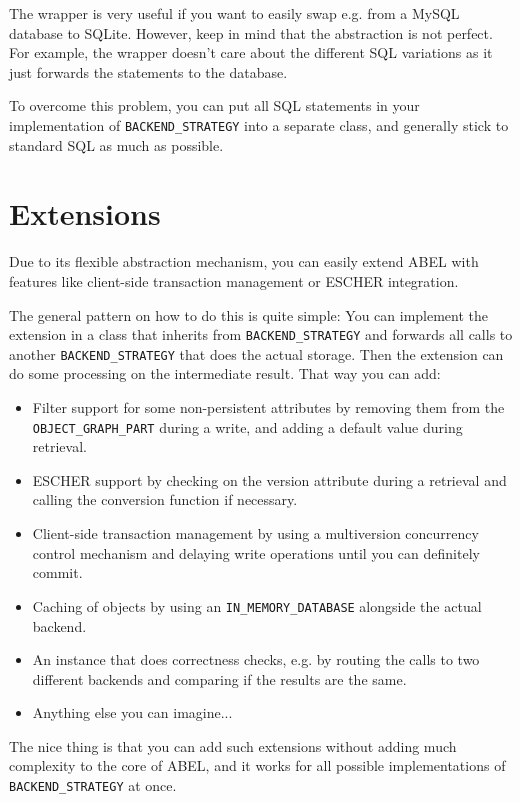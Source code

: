 The wrapper is very useful if you want to easily swap e.g. from a MySQL database to SQLite.
However, keep in mind that the abstraction is not perfect. 
For example, the wrapper doesn't care about the different SQL variations as it just forwards the statements to the database.

To overcome this problem, you can put all SQL statements in your implementation of \lstinline!BACKEND_STRATEGY! into a separate class, and generally stick to standard SQL as much as possible.


\section{Extensions}

Due to its flexible abstraction mechanism, you can easily extend ABEL with features like client-side transaction management or ESCHER \cite {escher} integration.

The general pattern on how to do this is quite simple: 
You can implement the extension in a class that inherits from \lstinline!BACKEND_STRATEGY! and forwards all calls to another \lstinline!BACKEND_STRATEGY! that does the actual storage.
Then the extension can do some processing on the intermediate result.
That way you can add:

\begin{itemize}
 \item Filter support for some non-persistent attributes by removing them from the \lstinline!OBJECT_GRAPH_PART! during a write, and adding a default value during retrieval.
 \item ESCHER support by checking on the version attribute during a retrieval and calling the conversion function if necessary.
 \item Client-side transaction management by using a multiversion concurrency control mechanism and delaying write operations until you can definitely commit.
 \item Caching of objects by using an \lstinline!IN_MEMORY_DATABASE! alongside the actual backend.
 \item An instance that does correctness checks, e.g. by routing the calls to two different backends and comparing if the results are the same.
 \item Anything else you can imagine...
\end{itemize}

The nice thing is that you can add such extensions without adding much complexity to the core of ABEL, and it works for all possible implementations of \lstinline!BACKEND_STRATEGY! at once.


